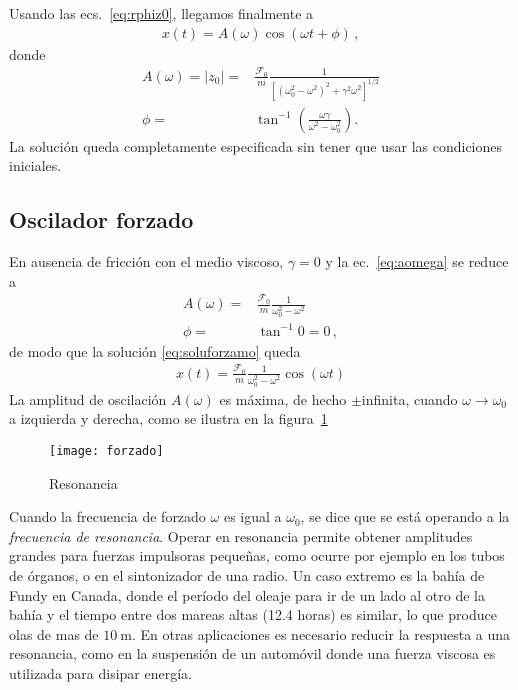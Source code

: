 \begin{frame}
Usando las ecs.~\eqref{eq:rphiz0}, llegamos finalmente a %
\begin{align}
  \label{eq:soluforzamo}
  x(t)=A(\omega)\cos(\omega t+\phi)\,,
\end{align}
donde
\begin{align}
  \label{eq:aomega}
  A(\omega)=|z_0|=&\frac{\mathcal{F}_0}{m}\frac{1}{\left[\left(\omega_0^2-\omega^2\right)^2+\gamma^2\omega^2\right]^{1/2}}\nonumber\\
  \phi=&\tan^{-1}\left(\frac{\omega\gamma}{\omega^2-\omega_0^2}\right).
\end{align}
La solución queda completamente especificada sin tener que usar las condiciones iniciales. %
\end{frame}

\subsection{Oscilador forzado}
En ausencia de fricción con el medio viscoso, $\gamma=0$ y la ec.~\eqref{eq:aomega} se reduce a
\begin{align*}
  A(\omega)=&\frac{\mathcal{F}_0}{m}\frac{1}{\omega_0^2-\omega^2}\nonumber\\
  \phi=&\tan^{-1}0=0\,,
\end{align*}
de modo que la solución \eqref{eq:soluforzamo} queda 
\begin{align*}
  x(t)=\frac{\mathcal{F}_0}{m}\frac{1}{\omega_0^2-\omega^2}\cos(\omega t)
\end{align*}
La amplitud de oscilación $A(\omega)$ es máxima, de hecho $\pm$infinita, cuando $\omega\to \omega_0$ a izquierda y derecha, como se ilustra en la figura~\ref{fig:resonance}
\begin{frame}
  \begin{figure}
    \centering
    \texttt{[image: forzado]}
    \caption{Resonancia}
    \label{fig:resonance}
  \end{figure}
\end{frame}


Cuando la frecuencia de forzado $\omega$ es igual a $\omega_0$, se dice que se está operando a la \emph{frecuencia de resonancia}. Operar en resonancia permite obtener amplitudes grandes para fuerzas impulsoras pequeñas, como ocurre por ejemplo en los tubos de órganos, o en el sintonizador de una radio. Un caso extremo es la bahía de Fundy en Canada, donde el período del oleaje para ir de un lado al otro de la bahía y el tiempo entre dos mareas altas (12.4 horas) es similar, lo que produce olas de mas de $\SI{10}{\meter}$.  En otras aplicaciones es necesario reducir la respuesta a una resonancia, como en la suspensión de un automóvil donde una fuerza viscosa es utilizada para disipar energía. 

